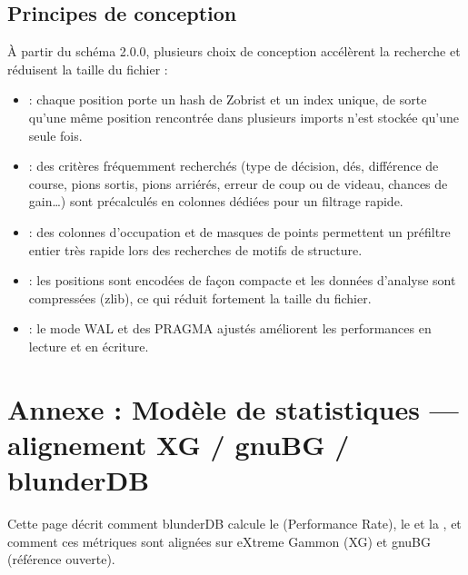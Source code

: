 \documentclass[letterpaper,10pt,french]{sphinxmanual}
\begin{document}
\subsection{Principes de conception}
\label{\detokenize{annexe_db_scheme:principes-de-conception}}
\sphinxAtStartPar
À partir du schéma 2.0.0, plusieurs choix de conception accélèrent la recherche
et réduisent la taille du fichier :
\begin{itemize}
\item {} 
\sphinxAtStartPar
{} : chaque position porte un hash de Zobrist et
un index unique, de sorte qu’une même position rencontrée dans plusieurs
imports n’est stockée qu’une seule fois.

\item {} 
\sphinxAtStartPar
{} : des critères fréquemment recherchés
(type de décision, dés, différence de course, pions sortis, pions arriérés,
erreur de coup ou de videau, chances de gain…) sont précalculés en colonnes
dédiées pour un filtrage rapide.

\item {} 
\sphinxAtStartPar
{} : des colonnes d’occupation et de masques de
points permettent un préfiltre entier très rapide lors des recherches de
motifs de structure.

\item {} 
\sphinxAtStartPar
{} : les positions sont encodées de façon compacte et les
données d’analyse sont compressées (zlib), ce qui réduit fortement la taille
du fichier.

\item {} 
\sphinxAtStartPar
{} : le mode WAL et des PRAGMA ajustés améliorent les
performances en lecture et en écriture.

\end{itemize}

\sphinxstepscope


\section{Annexe : Modèle de statistiques — alignement XG / gnuBG / blunderDB}
\label{\detokenize{stats_parity:annexe-modele-de-statistiques-alignement-xg-gnubg-blunderdb}}\label{\detokenize{stats_parity:stats-parity}}\label{\detokenize{stats_parity::doc}}
\sphinxAtStartPar
Cette page décrit comment blunderDB calcule le  (Performance Rate),
le  et la , et comment ces métriques sont
alignées sur eXtreme Gammon (XG) et gnuBG (référence ouverte).
\end{document}
